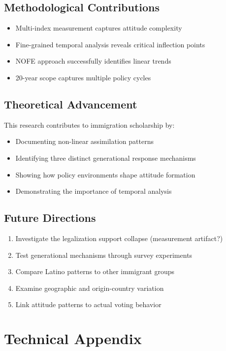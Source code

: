 \documentclass[11pt,letterpaper]{article}
\begin{document}
\subsection{Methodological Contributions}
\begin{itemize}
    \item Multi-index measurement captures attitude complexity
    \item Fine-grained temporal analysis reveals critical inflection points
    \item NOFE approach successfully identifies linear trends
    \item 20-year scope captures multiple policy cycles
\end{itemize}

\subsection{Theoretical Advancement}
This research contributes to immigration scholarship by:
\begin{itemize}
    \item Documenting non-linear assimilation patterns
    \item Identifying three distinct generational response mechanisms
    \item Showing how policy environments shape attitude formation
    \item Demonstrating the importance of temporal analysis
\end{itemize}

\subsection{Future Directions}
\begin{enumerate}
    \item Investigate the legalization support collapse (measurement artifact?)
    \item Test generational mechanisms through survey experiments
    \item Compare Latino patterns to other immigrant groups
    \item Examine geographic and origin-country variation
    \item Link attitude patterns to actual voting behavior
\end{enumerate}

\section{Technical Appendix}
\end{document}
